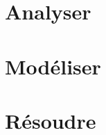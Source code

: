 \documentclass[10pt,fleqn]{book} %
\newcommand{\repStyle}{../../Style}
\begin{document}
\def\xxcompetences{}
\def\xxfigures{}

\graphicspath{{\repStyle/png/}}



\setlength{\columnseprule}{.1pt}

\chapter{Analyser}


\pagestyle{fancy}
\thispagestyle{plain}


\chapter{Modéliser}


\pagestyle{fancy}
\thispagestyle{plain}


\stopcontents

\chapter{Résoudre}

\newpage


\pagestyle{fancy}
\thispagestyle{plain}

\stopcontents

\newpage
\printindex
\end{document}
